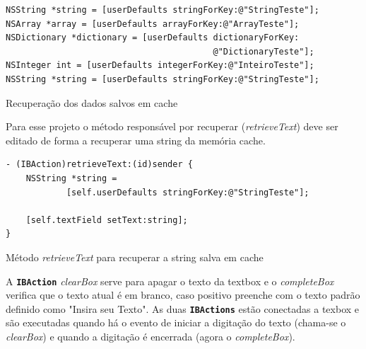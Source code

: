\documentclass[a4paper,12pt,brazil,doubleside]{book}
\begin{document}
\begin{singlespace}
\begin{listing}[H]
\begin{verbatim}
NSString *string = [userDefaults stringForKey:@"StringTeste"];
NSArray *array = [userDefaults arrayForKey:@"ArrayTeste"];
NSDictionary *dictionary = [userDefaults dictionaryForKey:
                                         @"DictionaryTeste"];
NSInteger int = [userDefaults integerForKey:@"InteiroTeste"];
NSString *string = [userDefaults stringForKey:@"StringTeste"];
\end{verbatim}
\caption{Recuperação dos dados salvos em cache}
\end{listing}


Para esse projeto o método responsável por recuperar (\emph{retrieveText}) deve ser editado de forma a recuperar uma string da memória cache.

\begin{listing}[H]
\begin{verbatim}
- (IBAction)retrieveText:(id)sender {
    NSString *string = 
    		[self.userDefaults stringForKey:@"StringTeste"];
    
    [self.textField setText:string];
}
\end{verbatim}
\caption{Método \emph{retrieveText} para recuperar a string salva em cache}
\end{listing}


A  \texttt{\textbf{IBAction}} \emph{clearBox} serve para apagar o texto da textbox e o \emph{completeBox} verifica que o texto atual é em branco, caso positivo preenche com o texto padrão definido como "Insira seu Texto".
As duas \texttt{\textbf{IBActions}} estão conectadas a texbox e são executadas quando há o evento de iniciar a digitação do texto (chama-se o \emph{clearBox}) e quando a digitação é encerrada (agora o \emph{completeBox}).


\end{singlespace}
\end{document}
